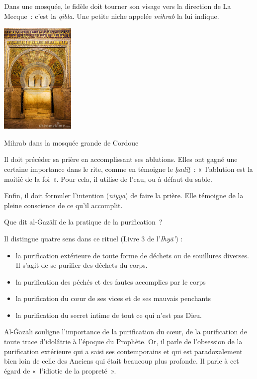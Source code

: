 Dans une mosquée, le fidèle doit tourner son visage vers la direction de
La Mecque~: c'est la \emph{qibla}. Une petite niche appelée
\emph{mihrab} la lui indique.

\begin{marginfigure}
    \centering
  \includegraphics[width=1.40972in,height=2.11458in]{Images/image059.jpg}
    \caption{Mihrab dans la mosquée grande de Cordoue}
    \label{fig:Mihrab}
\end{marginfigure}


Il doit précéder sa prière en accomplissant ses ablutions. Elles ont
gagné une certaine importance dans le rite, comme en témoigne le
\emph{ḥadīṯ}~: «~l'ablution est la moitié de la foi~». Pour cela, il utilise de l'eau, ou à défaut
du sable.

Enfin, il doit formuler l'intention (\emph{niyya}) de faire la prière.
Elle témoigne de la pleine conscience de ce qu'il accomplit.

Que dit al-Ġazālī \label{theol:AlGazali11} de la pratique de la purification~?

Il distingue quatre sens dans ce rituel (Livre 3 de l'\emph{Ihyā'}) :

\begin{itemize}
\item
  la purification extérieure de toute forme de déchets ou de souillures
  diverses. Il s'agit de se purifier des déchets du corps.
\item
  la purification des péchés et des fautes accomplies par le corps
\item
  la purification du cœur de ses vices et de ses mauvais penchants
\item
  la purification du secret intime de tout ce qui n'est pas Dieu.
\end{itemize}

Al-Ġazālī \label{theol:AlGazali12} souligne l'importance de la purification du cœur, de la
purification de toute trace d'idolâtrie à l'époque du Prophète. Or, il
parle de l'obsession de la purification extérieure qui a saisi ses
contemporains et qui est paradoxalement bien loin de celle des Anciens
qui était beaucoup plus profonde. Il parle à cet égard de «~l'idiotie de
la propreté~».

